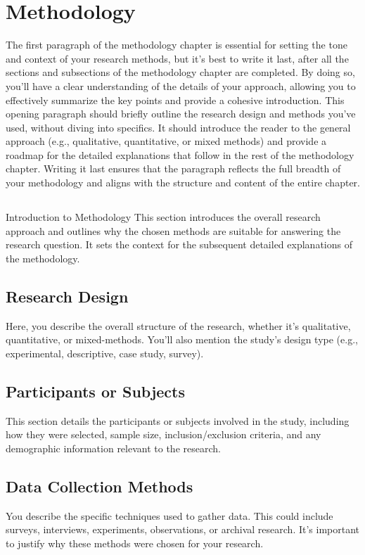 \chapter{Methodology}
The first paragraph of the methodology chapter is essential for setting the tone and context of your research methods, but it’s best to write it last, after all the sections and subsections of the methodology chapter are completed. By doing so, you'll have a clear understanding of the details of your approach, allowing you to effectively summarize the key points and provide a cohesive introduction. This opening paragraph should briefly outline the research design and methods you've used, without diving into specifics. It should introduce the reader to the general approach (e.g., qualitative, quantitative, or mixed methods) and provide a roadmap for the detailed explanations that follow in the rest of the methodology chapter. Writing it last ensures that the paragraph reflects the full breadth of your methodology and aligns with the structure and content of the entire chapter.

\section{}{Introduction to Methodology}
This section introduces the overall research approach and outlines why the chosen methods are suitable for answering the research question. It sets the context for the subsequent detailed explanations of the methodology.


\section{Research Design}
Here, you describe the overall structure of the research, whether it's qualitative, quantitative, or mixed-methods. You’ll also mention the study's design type (e.g., experimental, descriptive, case study, survey).


\section{Participants or Subjects}
This section details the participants or subjects involved in the study, including how they were selected, sample size, inclusion/exclusion criteria, and any demographic information relevant to the research.


\section{Data Collection Methods}
You describe the specific techniques used to gather data. This could include surveys, interviews, experiments, observations, or archival research. It’s important to justify why these methods were chosen for your research.


